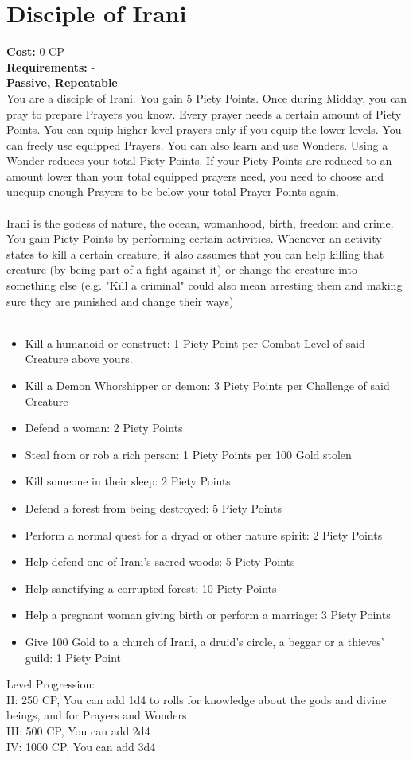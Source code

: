 \section{Disciple of Irani}
\textbf{Cost:} 0 CP\\
\textbf{Requirements:} - \\
\textbf{Passive, Repeatable}\\
You are a disciple of Irani. You gain 5 Piety Points. Once during Midday, you can pray to prepare Prayers you know. Every prayer needs a certain amount of Piety Points. You can equip higher level prayers only if you equip the lower levels. You can freely use equipped Prayers. You can also learn and use Wonders. Using a Wonder reduces your total Piety Points. If your Piety Points are reduced to an amount lower than your total equipped prayers need, you need to choose and unequip enough Prayers to be below your total Prayer Points again.\\
\\
Irani is the godess of nature, the ocean, womanhood, birth, freedom and crime. You gain Piety Points by performing certain activities. Whenever an activity states to kill a certain creature, it also assumes that you can help killing that creature (by being part of a fight against it) or change the creature into something else (e.g. "Kill a criminal" could also mean arresting them and making sure they are punished and change their ways)\\
\\
\begin{itemize}
	\item Kill a humanoid or construct: 1 Piety Point per Combat Level of said Creature above yours.
	\item Kill a Demon Whorshipper or demon: 3 Piety Points per Challenge of said Creature
	\item Defend a woman: 2 Piety Points
	\item Steal from or rob a rich person: 1 Piety Points per 100 Gold stolen
	\item Kill someone in their sleep: 2 Piety Points
	\item Defend a forest from being destroyed: 5 Piety Points
	\item Perform a normal quest for a dryad or other nature spirit: 2 Piety Points
	\item Help defend one of Irani's sacred woods: 5 Piety Points
	\item Help sanctifying a corrupted forest: 10 Piety Points
	\item Help a pregnant woman giving birth or perform a marriage: 3 Piety Points
	\item Give 100 Gold to a church of Irani, a druid's circle, a beggar or a thieves' guild: 1 Piety Point
\end{itemize}

Level Progression:\\
II: 250 CP, You can add 1d4 to rolls for knowledge about the gods and divine beings, and for Prayers and Wonders\\
III: 500 CP, You can add 2d4\\
IV: 1000 CP, You can add 3d4\\